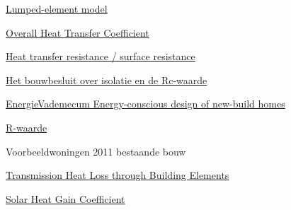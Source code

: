 \documentclass[a4paper,10pt]{article}
\begin{document}
\begin{thebibliography}{9}


\href{https://en.wikipedia.org/wiki/Lumped-element_model}{Lumped-element model}

\href{https://www.engineeringtoolbox.com/overall-heat-transfer-coefficient-d_434.html}{Overall Heat Transfer Coefficient}


\href{https://www.htflux.com/en/documentation/boundary-conditions/surface-resistance-heat-transfer-coefficient/}{Heat transfer resistance / surface resistance}


\href{https://www.isolatiemateriaal.nl/kenniscentrum/het-bouwbesluit-over-isolatie-en-rc-waarde/}{Het bouwbesluit over isolatie en de Rc-waarde}


\href{https://v-1isso-1nl-1y6tawt2z0091.stcproxy.han.nl/q/9d67bdb7/}{EnergieVademecum Energy-conscious design of new-build homes}


\href{https://www.joostdevree.nl/shtmls/r-waarde.shtml}{R-waarde}


 Voorbeeldwoningen 2011 bestaande bouw


\href{https://www.engineeringtoolbox.com/heat-loss-transmission-d_748.html}{Transmission Heat Loss through Building Elements}


\href{https://www.e-education.psu.edu/egee102/node/2019}{Solar Heat Gain Coefficient}



\end{thebibliography}
\end{document}
